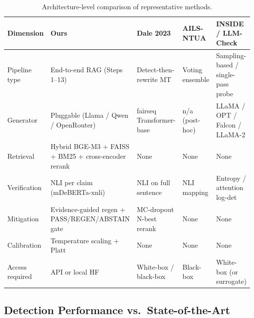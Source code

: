 \begin{table}[ht]
\centering
\small
\begin{tabular}{p{3.4cm}p{2.2cm}p{2.2cm}p{2.2cm}p{2.2cm}}
\hline
\textbf{Dimension} & \textbf{Ours} & \textbf{Dale 2023} & \textbf{AILS-NTUA} & \textbf{INSIDE / LLM-Check} \\
\hline
Pipeline type & End-to-end RAG (Steps 1--13) & Detect-then-rewrite MT & Voting ensemble & Sampling-based / single-pass probe \\
Generator & Pluggable (Llama / Qwen / OpenRouter) & fairseq Transformer-base & n/a (post-hoc) & LLaMA / OPT / Falcon / LLaMA-2 \\
Retrieval & Hybrid BGE-M3 + FAISS + BM25 + cross-encoder rerank & None & None & None \\
Verification & NLI per claim (mDeBERTa-xnli) & NLI on full sentence & NLI mapping & Entropy / attention log-det \\
Mitigation & Evidence-guided regen + PASS/REGEN/ABSTAIN gate & MC-dropout N-best rerank & None & None \\
Calibration & Temperature scaling + Platt & None & None & None \\
Access required & API or local HF & White-box / black-box & Black-box & White-box (or surrogate) \\
\hline
\end{tabular}
\caption{Architecture-level comparison of representative methods.}
\label{tab:arch-comparison}
\end{table}

\subsection{Detection Performance vs.\ State-of-the-Art}
\label{sec:detection-perf}

